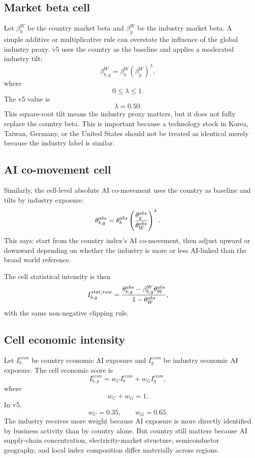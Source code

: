 \documentclass[11pt]{article}
\begin{document}
\subsection{Market beta cell}

Let $\beta_b^W$ be the country market beta and $\beta_g^W$ be the industry market beta. A simple additive or multiplicative rule can overstate the influence of the global industry proxy. v5 uses the country as the baseline and applies a moderated industry tilt:
\[
\beta_{b,g}^W
=
\beta_b^W(\beta_g^W)^{\lambda},
\]
where
\[
0\leq \lambda\leq 1.
\]
The v5 value is
\[
\lambda=0.50.
\]
This square-root tilt means the industry proxy matters, but it does not fully replace the country beta. This is important because a technology stock in Korea, Taiwan, Germany, or the United States should not be treated as identical merely because the industry label is similar.

\subsection{AI co-movement cell}

Similarly, the cell-level absolute AI co-movement uses the country as baseline and tilts by industry exposure:
\[
\theta_{b,g}^{abs}
=
\theta_b^{abs}\left({\theta_g^{abs}\over \theta_W^{abs}}\right)^{\lambda}.
\]
This says: start from the country index's AI co-movement, then adjust upward or downward depending on whether the industry is more or less AI-linked than the broad world reference.

The cell statistical intensity is then
\[
I_{b,g}^{stat,raw}
=
{\theta_{b,g}^{abs}-\beta_{b,g}^W\theta_W^{abs}\over 1-\theta_W^{abs}},
\]
with the same non-negative clipping rule.

\subsection{Cell economic intensity}

Let $I_b^{econ}$ be country economic AI exposure and $I_g^{econ}$ be industry economic AI exposure. The cell economic score is
\[
I_{b,g}^{econ}=w_C I_b^{econ}+w_G I_g^{econ},
\]
where
\[
w_C+w_G=1.
\]
In v5,
\[
w_C=0.35,
\qquad w_G=0.65.
\]
The industry receives more weight because AI exposure is more directly identified by business activity than by country alone. But country still matters because AI supply-chain concentration, electricity-market structure, semiconductor geography, and local index composition differ materially across regions.
\end{document}
